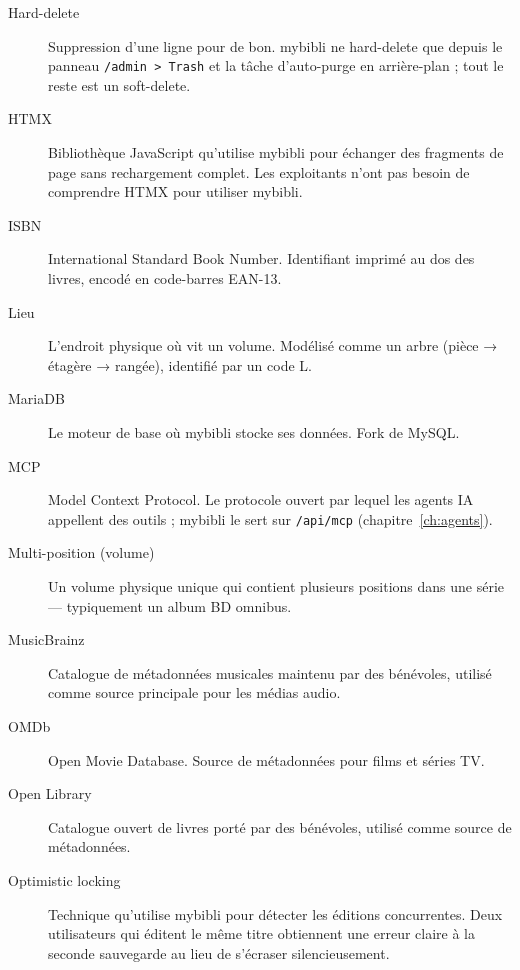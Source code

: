 \begin{description}
  \item[Hard-delete] Suppression d'une ligne pour de bon. mybibli
        ne hard-delete que depuis le panneau \texttt{/admin >
        Trash} et la tâche d'auto-purge en arrière-plan ; tout le
        reste est un soft-delete.

  \item[HTMX] Bibliothèque JavaScript qu'utilise mybibli pour
        échanger des fragments de page sans rechargement complet.
        Les exploitants n'ont pas besoin de comprendre HTMX pour
        utiliser mybibli.

  \item[ISBN] International Standard Book Number. Identifiant
        imprimé au dos des livres, encodé en code-barres EAN-13.

  \item[Lieu] L'endroit physique où vit un volume.
        Modélisé comme un arbre (pièce → étagère → rangée),
        identifié par un code L.

  \item[MariaDB] Le moteur de base où mybibli stocke ses données.
        Fork de MySQL.

  \item[MCP] Model Context Protocol. Le protocole ouvert
        par lequel les agents IA appellent des outils ; mybibli le
        sert sur \texttt{/api/mcp} (chapitre~\ref{ch:agents}).

  \item[Multi-position (volume)] Un volume
        physique unique qui contient plusieurs positions dans une
        série — typiquement un album BD omnibus.

  \item[MusicBrainz] Catalogue de métadonnées
        musicales maintenu par des bénévoles, utilisé comme source
        principale pour les médias audio.

  \item[OMDb] Open Movie Database. Source de
        métadonnées pour films et séries TV.

  \item[Open Library] Catalogue ouvert de
        livres porté par des bénévoles, utilisé comme source de
        métadonnées.

  \item[Optimistic locking] Technique qu'utilise mybibli pour
        détecter les éditions concurrentes. Deux utilisateurs qui
        éditent le même titre obtiennent une erreur claire à la
        seconde sauvegarde au lieu de s'écraser silencieusement.


\end{description}
